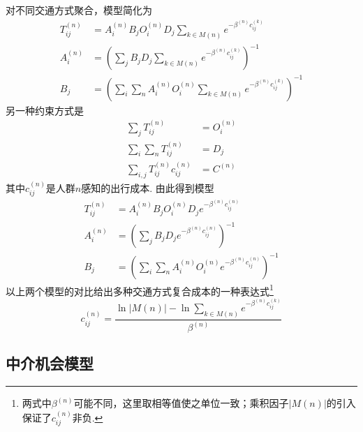 对不同交通方式聚合，模型简化为
\begin{align}
    T_{ij}^{(n)}&=A_i^{(n)}B_jO_i^{(n)}D_j \sum_{k\in M(n)} e^{-\beta^{(n)} c_{ij}^{(k)}}\\
    A_i^{(n)} &= \left(\sum_jB_jD_j \sum_{k\in M(n)}  e^{-\beta^{(n)} c_{ij}^{(k)}}\right)^{-1}\\
    B_j &= \left(\sum_i \sum_n A_i^{(n)}O_i^{(n)} \sum_{k\in M(n)} e^{-\beta^{(n)} c_{ij}^{(k)}}\right)^{-1}
\end{align}
另一种约束方式是
\begin{align}
    \sum_j T_{ij}^{(n)}&=O_i^{(n)}\\
    \sum_i \sum_n T_{ij}^{(n)}&=D_j\\
    \sum_{i,j} T_{ij}^{(n)}c_{ij}^{(n)} &=C^{(n)}
\end{align}
其中$c_{ij}^{(n)}$是人群$n$感知的出行成本. 由此得到模型
\begin{align}
    T_{ij}^{(n)}&=A_i^{(n)}B_jO_i^{(n)}D_j e^{-\beta^{(n)} c_{ij}^{(n)}} \label{eq:groupalt}\\
    A_i^{(n)} &= \left(\sum_jB_jD_j e^{-\beta^{(n)} c_{ij}^{(n)}}\right)^{-1}\\
    B_j &= \left(\sum_i \sum_n A_i^{(n)}O_i^{(n)} e^{-\beta^{(n)} c_{ij}^{(n)}}\right)^{-1}
\end{align}
以上两个模型的对比给出多种交通方式复合成本的一种表达式\footnote{两式中$\beta^{(n)}$可能不同，这里取相等值使之单位一致；乘积因子$\vert M(n)\vert$的引入保证了$c_{ij}^{(n)}$非负. }
\begin{equation}
    c_{ij}^{(n)}=\frac{\ln \vert M(n)\vert-\ln \sum_{k\in M(n)}e^{-\beta^{(n)} c_{ij}^{(k)}}}{\beta^{(n)}}
\end{equation}

\subsection{中介机会模型}

